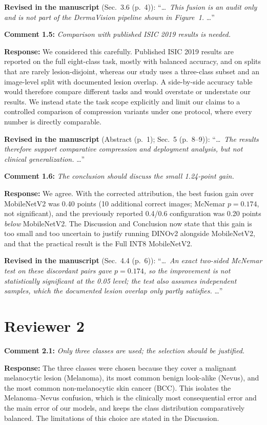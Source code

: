 \documentclass[11pt,a4paper]{article}
\begin{document}
\textbf{Revised in the manuscript} (Sec.~3.6 (p.~4)): ``\ldots\ \emph{This fusion is an audit only and is not part of the DermaVision pipeline shown in Figure~1.} \ldots''

\medskip
\textbf{Comment 1.5:} \emph{Comparison with published ISIC 2019 results is needed.}

\textbf{Response:} We considered this carefully. Published ISIC 2019 results are reported on the full eight-class task, mostly with balanced accuracy, and on splits that are rarely lesion-disjoint, whereas our study uses a three-class subset and an image-level split with documented lesion overlap. A side-by-side accuracy table would therefore compare different tasks and would overstate or understate our results. We instead state the task scope explicitly and limit our claims to a controlled comparison of compression variants under one protocol, where every number is directly comparable.

\textbf{Revised in the manuscript} (Abstract (p.~1); Sec.~5 (p.~8--9)): ``\ldots\ \emph{The results therefore support comparative compression and deployment analysis, but not clinical generalization.} \ldots''

\medskip
\textbf{Comment 1.6:} \emph{The conclusion should discuss the small 1.24-point gain.}

\textbf{Response:} We agree. With the corrected attribution, the best fusion gain over MobileNetV2 was 0.40 points (10 additional correct images; McNemar $p = 0.174$, not significant), and the previously reported 0.4/0.6 configuration was 0.20 points \emph{below} MobileNetV2. The Discussion and Conclusion now state that this gain is too small and too uncertain to justify running DINOv2 alongside MobileNetV2, and that the practical result is the Full INT8 MobileNetV2.

\textbf{Revised in the manuscript} (Sec.~4.4 (p.~6)): ``\ldots\ \emph{An exact two-sided McNemar test on these discordant pairs gave $p = 0.174$, so the improvement is not statistically significant at the 0.05 level; the test also assumes independent samples, which the documented lesion overlap only partly satisfies.} \ldots''


\section*{Reviewer 2}
\textbf{Comment 2.1:} \emph{Only three classes are used; the selection should be justified.}

\textbf{Response:} The three classes were chosen because they cover a malignant melanocytic lesion (Melanoma), its most common benign look-alike (Nevus), and the most common non-melanocytic skin cancer (BCC). This isolates the Melanoma--Nevus confusion, which is the clinically most consequential error and the main error of our models, and keeps the class distribution comparatively balanced. The limitations of this choice are stated in the Discussion.
\end{document}
